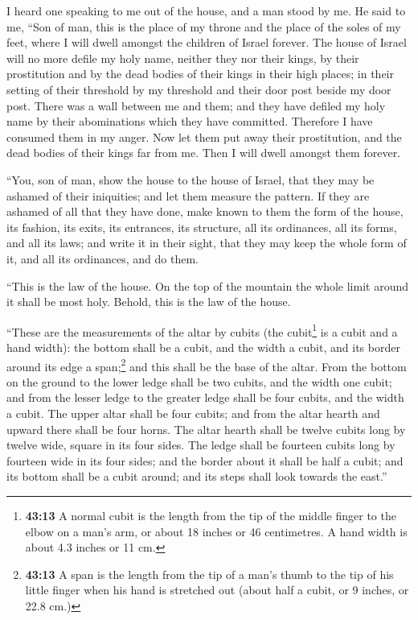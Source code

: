  I heard one speaking to me out of the house, and a man
stood by me.  He said to me, ``Son of man, this is the
place of my throne and the place of the soles of my feet, where I will
dwell amongst the children of Israel forever. The house of Israel will
no more defile my holy name, neither they nor their kings, by their
prostitution and by the dead bodies of their kings in their high places;
 in their setting of their threshold by my threshold and
their door post beside my door post. There was a wall between me and
them; and they have defiled my holy name by their abominations which
they have committed. Therefore I have consumed them in my anger.
 Now let them put away their prostitution, and the dead
bodies of their kings far from me. Then I will dwell amongst them
forever.

 ``You, son of man, show the house to the house of
Israel, that they may be ashamed of their iniquities; and let them
measure the pattern.  If they are ashamed of all that
they have done, make known to them the form of the house, its fashion,
its exits, its entrances, its structure, all its ordinances, all its
forms, and all its laws; and write it in their sight, that they may keep
the whole form of it, and all its ordinances, and do them.

 ``This is the law of the house. On the top of the
mountain the whole limit around it shall be most holy. Behold, this is
the law of the house.

 ``These are the measurements of the altar by cubits (the
cubit\footnote{\textbf{43:13} A normal cubit is the length from the tip
  of the middle finger to the elbow on a man's arm, or about 18 inches
  or 46 centimetres. A hand width is about 4.3 inches or 11 cm.} is a
cubit and a hand width): the bottom shall be a cubit, and the width a
cubit, and its border around its edge a span;\footnote{\textbf{43:13} A
  span is the length from the tip of a man's thumb to the tip of his
  little finger when his hand is stretched out (about half a cubit, or 9
  inches, or 22.8 cm.)} and this shall be the base of the altar.
 From the bottom on the ground to the lower ledge shall
be two cubits, and the width one cubit; and from the lesser ledge to the
greater ledge shall be four cubits, and the width a cubit.
 The upper altar shall be four cubits; and from the altar
hearth and upward there shall be four horns.  The altar
hearth shall be twelve cubits long by twelve wide, square in its four
sides.  The ledge shall be fourteen cubits long by
fourteen wide in its four sides; and the border about it shall be half a
cubit; and its bottom shall be a cubit around; and its steps shall look
towards the east.''

